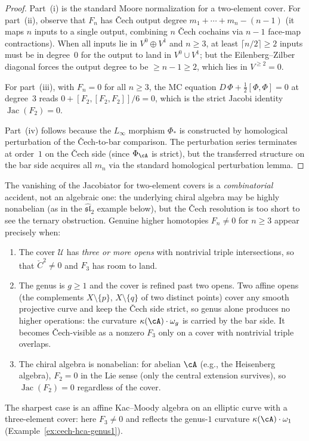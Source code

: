 \begin{proof}
Part~(i) is the standard Moore normalization for a two-element
cover. For part~(ii), observe that $F_n$ has \v{C}ech output
degree $m_1 + \cdots + m_n - (n-1)$ (it maps $n$ inputs to a
single output, combining $n$ \v{C}ech cochains via $n{-}1$
face-map contractions). When all inputs lie in $V^0 \oplus V^1$
and $n \geq 3$, at least $\lceil n/2\rceil \geq 2$ inputs must
be in degree~$0$ for the output to land in $V^0 \cup V^1$; but
the Eilenberg--Zilber diagonal forces the output degree to be
$\geq n - 1 \geq 2$, which lies in $V^{\geq 2} = 0$.

For part~(iii), with $F_n = 0$ for all $n \geq 3$, the MC
equation $D\,\Phi + \tfrac{1}{2}[\Phi,\Phi] = 0$ at degree~$3$
reads $0 + [F_2,[F_2,F_2]]/6 = 0$, which is the strict Jacobi
identity $\operatorname{Jac}(F_2) = 0$.

Part~(iv) follows because the $L_\infty$ morphism $\Phi_*$ is
constructed by homological perturbation of the \v{C}ech-to-bar
comparison. The perturbation series terminates at order~$1$ on
the \v{C}ech side (since $\Phi_\cA$ is strict), but the
transferred structure on the bar side acquires all $m_n$ via the
standard homological perturbation lemma.
\end{proof}

\begin{remark}
\label{rem:jacobiator-appearance}
The vanishing of the Jacobiator for two-element covers is a
\emph{combinatorial} accident, not an algebraic one: the
underlying chiral algebra may be highly nonabelian (as in the
$\widehat{\mathfrak{sl}}_2$ example below), but the \v{C}ech
resolution is too short to see the ternary obstruction. Genuine
higher homotopies $F_n \neq 0$ for $n \geq 3$ appear precisely
when:
\begin{enumerate}[label=\textup{(\alph*)}]
\item The cover $\mathcal{U}$ has \emph{three or more opens} with
 nontrivial triple intersections, so that $\check{C}^2 \neq 0$
 and $F_3$ has room to land.
\item The genus is $g \geq 1$ and the cover is refined past two
 opens. Two affine opens \textup{(}the complements
 $X\setminus\{p\}$, $X\setminus\{q\}$ of two distinct points\textup{)}
 cover any smooth projective curve and keep the \v{C}ech side
 strict, so genus alone produces no higher operations: the
 curvature $\kappa(\cA)\cdot\omega_g$ is carried by the bar side.
 It becomes \v{C}ech-visible as a nonzero $F_3$ only on a cover
 with nontrivial triple overlaps.
\item The chiral algebra is nonabelian: for abelian $\cA$
 (e.g., the Heisenberg algebra), $F_2 = 0$ in the Lie sense
 (only the central extension survives), so
 $\operatorname{Jac}(F_2) = 0$ regardless of the cover.
\end{enumerate}
The sharpest case is an affine Kac--Moody algebra on an elliptic
curve with a three-element cover: here $F_3 \neq 0$ and reflects
the genus-$1$ curvature $\kappa(\cA)\cdot\omega_1$
(Example~\ref{ex:cech-hca-genus1}).
\end{remark}


